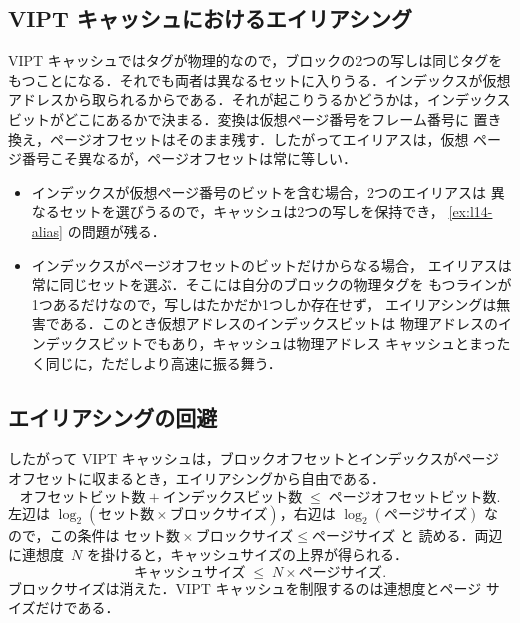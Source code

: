 \documentclass[../main.tex]{subfiles}
\begin{document}
\subsection{VIPT キャッシュにおけるエイリアシング}

VIPT キャッシュではタグが物理的なので，ブロックの2つの写しは同じタグを
もつことになる．それでも両者は異なるセットに入りうる．インデックスが仮想
アドレスから取られるからである．それが起こりうるかどうかは，インデックス
ビットがどこにあるかで決まる．変換は仮想ページ番号をフレーム番号に
置き換え，ページオフセットはそのまま残す．したがってエイリアスは，仮想
ページ番号こそ異なるが，ページオフセットは常に等しい．
\begin{itemize}
  \item インデックスが仮想ページ番号のビットを含む場合，2つのエイリアスは
    異なるセットを選びうるので，キャッシュは2つの写しを保持でき，
    \cref{ex:l14-alias} の問題が残る．
  \item インデックスがページオフセットのビットだけからなる場合，
    エイリアスは常に同じセットを選ぶ．そこには自分のブロックの物理タグを
    もつラインが1つあるだけなので，写しはたかだか1つしか存在せず，
    エイリアシングは無害である．このとき仮想アドレスのインデックスビットは
    物理アドレスのインデックスビットでもあり，キャッシュは物理アドレス
    キャッシュとまったく同じに，ただしより高速に振る舞う．
\end{itemize}

\subsection{エイリアシングの回避}

したがって VIPT キャッシュは，ブロックオフセットとインデックスがページ
オフセットに収まるとき，エイリアシングから自由である．
\begin{equation}
  \text{オフセットビット数} + \text{インデックスビット数} \;\le\; \text{ページオフセットビット数} .
  \label{eq:l14-vipt-bits}
\end{equation}
左辺は $\log_2(\text{セット数} \times \text{ブロックサイズ})$，右辺は
$\log_2(\text{ページサイズ})$ なので，この条件は
$\text{セット数} \times \text{ブロックサイズ} \le \text{ページサイズ}$ と
読める．両辺に連想度~$N$ を掛けると，キャッシュサイズの上界が得られる．
\begin{equation}
  \text{キャッシュサイズ} \;\le\; N \times \text{ページサイズ} .
  \label{eq:l14-vipt-size}
\end{equation}
ブロックサイズは消えた．VIPT キャッシュを制限するのは連想度とページ
サイズだけである．
\end{document}
